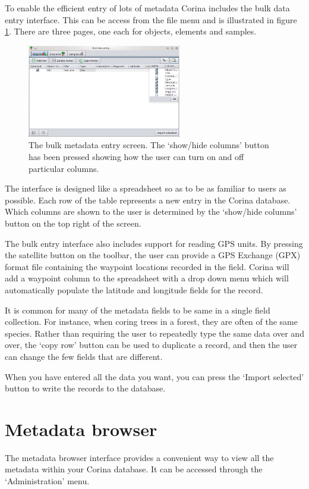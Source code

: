 To enable the efficient entry of lots of metadata Corina includes the bulk data entry interface.  This can be access from the file menu and is illustrated in figure \ref{fig:bulkentry}.  There are three pages, one each for objects, elements and samples.

\begin{figure}
\centering
\includegraphics[width=0.6\textwidth]{Images/bulkentry.png}
\caption{The bulk metadata entry screen.  The `show/hide columns' button has been pressed showing how the user can turn on and off particular columns.} 
\label{fig:bulkentry}
\end{figure}

The interface is designed like a spreadsheet so as to be as familiar to users as possible.  Each row of the table represents a new entry in the Corina database.  Which columns are shown to the user is determined by the `show/hide columns' button on the top right of the screen.  

The bulk entry interface also includes support for reading GPS units.  By pressing the satellite button on the toolbar, the user can provide a GPS Exchange (GPX) format file containing the waypoint locations recorded in the field.   Corina will add a waypoint column to the spreadsheet with a drop down menu which will automatically populate the latitude and longitude fields for the record. 

It is common for many of the metadata fields to be same in a single field collection.  For instance, when coring trees in a forest, they are often of the same species.  Rather than requiring the user to repeatedly type the same data over and over, the `copy row' button can be used to duplicate a record, and then the user can change the few fields that are different.

When you have entered all the data you want, you can press the `Import selected' button to write the records to the database.  

\section{Metadata browser}
The metadata browser interface provides a convenient way to view all the metadata within your Corina database.  It can be accessed through the `Administration' menu.

